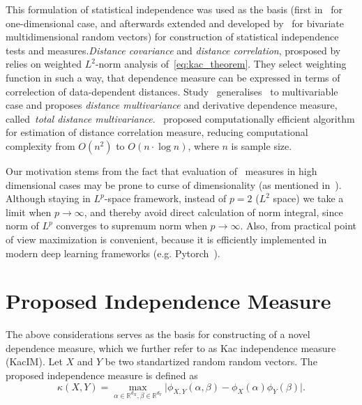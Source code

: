 \documentclass{article}
\begin{document}
This formulation of statistical independence was used as the basis (first in~\cite{Feuerverger} for one-dimensional case, and afterwards extended and developed by~\cite{Szekely} for bivariate multidimensional random vectors) for construction of statistical independence tests and measures.\textit{Distance covariance} and \textit{distance correlation}, prosposed by ~\cite{Szekely} relies on weighted $L^{2}$-norm analysis of~\eqref{eq:kac_theorem}. They select weighting function in such a way, that dependence measure can be expressed in terms of correlection of data-dependent distances. Study~\cite{Bottcher} generalises~\cite{Szekely} to multivariable case and proposes \textit{distance multivariance} and derivative dependence measure, called~\textit{total distance multivariance}.~\cite{CHAUDHURI201915} proposed computationally efficient algorithm for estimation of distance correlation measure, reducing computational complexity from $O(n^2)$ to $O(n\cdot \log n)$, where $n$ is sample size.

Our motivation stems from the fact that evaluation of~\cite{Szekely} measures in high dimensional cases may be prone to curse of dimensionality (as mentioned in~\cite{Edlemann}). Although staying in $L^{p}$-space framework, instead of $p = 2$ ($L^{2}$ space) we take a limit when  $p \rightarrow \infty$, and thereby avoid direct calculation of norm integral, since norm of $L^{p}$ converges to supremum norm when $p \rightarrow \infty$. Also, from practical point of view maximization is convenient, because it is efficiently implemented in modern deep learning frameworks (e.g. Pytorch~\cite{NEURIPS2019_9015}). %

\section{Proposed Independence Measure}
\label{section:proposed_method}



\noindent The above considerations serves as the basis for constructing of a novel dependence measure, which we further refer to as Kac independence measure (KacIM). Let $X$ and $Y$ be two standartized random random vectors. The proposed independence measure is defined as
\begin{equation}
\label{eq:kim}
    \kappa(X,Y) = \max_{\alpha \in \mathbb{R}^{d_{X}}, \beta \in \mathbb{R}^{d_{Y}}} \vert \phi_{X,Y}(\alpha, \beta)  -\phi_{X}(\alpha) \phi_{Y}(\beta) \vert.
\end{equation}
\end{document}
